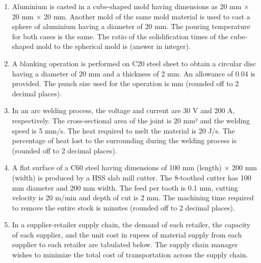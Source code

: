 \documentclass[journal,11pt,onecolumn]{IEEEtran}
\begin{document}
\begin{enumerate}[resume]
    \item Aluminium is casted in a cube-shaped mold having dimensions as 20 mm × 20 mm × 20 mm. Another mold of the same mold material is used to cast a sphere of aluminium having a diameter of 20 mm. The pouring temperature for both cases is the same. The ratio of the solidification times of the cube-shaped mold to the spherical mold is \underline{\hspace{2cm}} (answer in integer).

    \item A blanking operation is performed on C20 steel sheet to obtain a circular disc having a diameter of 20 mm and a thickness of 2 mm. An allowance of 0.04 is provided. The punch size used for the operation is \underline{\hspace{2cm}} mm (rounded off to 2 decimal places).

    \item In an arc welding process, the voltage and current are 30 V and 200 A, respectively. The cross-sectional area of the joint is 20 mm² and the welding speed is 5 mm/s. The heat required to melt the material is 20 J/s. The percentage of heat lost to the surrounding during the welding process is \underline{\hspace{2cm}} (rounded off to 2 decimal places).

    \item A flat surface of a C60 steel having dimensions of 100 mm (length) × 200 mm (width) is produced by a HSS slab mill cutter. The 8-toothed cutter has 100 mm diameter and 200 mm width. The feed per tooth is 0.1 mm, cutting velocity is 20 m/min and depth of cut is 2 mm. The machining time required to remove the entire stock is \underline{\hspace{2cm}} minutes (rounded off to 2 decimal places).

    \item In a supplier-retailer supply chain, the demand of each retailer, the capacity of each supplier, and the unit cost in rupees of material supply from each supplier to each retailer are tabulated below. The supply chain manager wishes to minimize the total cost of transportation across the supply chain.


\end{enumerate}
\end{document}
